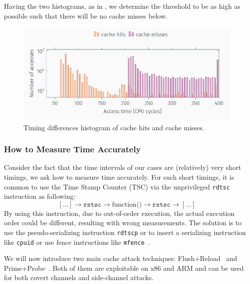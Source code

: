 \noindent Having the two histograms, as in , we
determine the threshold to be as high as possible such that there will be no
cache misses below. 
\begin{figure}[!ht]
    \centering
    \includegraphics[width=\textwidth]{images/chapter_6/cache_hits_misses_hist.JPG}
    \caption{Timing differences histogram of cache hits and cache misses.}
    \label{fig:cache_hits_misses_hist}
\end{figure}

\subsubsection{How to Measure Time Accurately}
\label{subsubsec:howtomeasuretimeaccuractely}
Consider the fact that the time intervals of our cases are (relatively) very
short timings, we ask how to measure time accurately. For such short timings, it
is common to use the Time Stamp Counter (TSC) via the unprivileged
\texttt{rdtsc} instruction as following:
$$[...] \rightarrow \texttt{rstsc} \rightarrow \mbox{function()} \rightarrow
\texttt{rstsc} \rightarrow [...]$$ \noindent By using this instruction, due to
out-of-order execution, the actual execution order could be different, resulting with
wrong measurements. The solution is to use the pseudo-serializing instruction
\texttt{rdtscp} or to insert a serializing instruction like \texttt{cpuid} or
use fence instructions like \texttt{mfence}~\cite{benchmark2010}.

We will now introduce two main cache attack  techniques:
Flush+Reload~\cite{Gullasch:2011:CGB:2006077.2006784,
Osvik:2006:CAC:2117739.2117741, Yarom2014} and
Prime+Probe~\cite{Percival2009,Osvik:2006:CAC:2117739.2117741,Liu:2015:LCS:2867539.2867673}.
Both of them are exploitable on x86 and ARM and can be used for both covert
channels and side-channel attacks.
